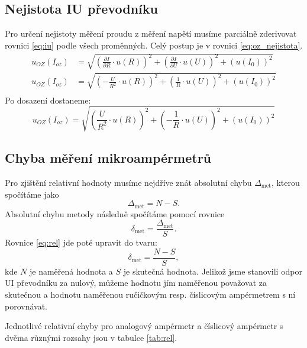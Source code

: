 \documentclass[a4paper,12pt]{article}   %
\begin{document}
\subsection{Nejistota IU převodníku}
Pro určení nejistoty měření proudu z měření napětí musíme parciálně zderivovat rovnici \ref{eq:iu} podle všech proměnných. Celý postup je v rovnici \ref{eq:oz_nejistota}.
\begin{equation}
    \begin{split}
        u_{OZ}(I_{oz})&=\sqrt{\left(\frac{\partial I}{\partial R} \cdot u(R)\right)^2+\left(\frac{\partial I}{\partial U} \cdot u(U)\right)^2+\left(u(I_0)\right)^2}\\
        u_{OZ}(I_{oz})&=\sqrt{\left(-\frac{U}{R^2}\cdot u(R)\right)^2+\left(\frac{1}{R}\cdot u(U)\right)^2+\left(u(I_0)\right)^2}\\
    \end{split}
    \label{eq:oz_nejistota}
\end{equation}
Po dosazení dostaneme:
\begin{equation*}
    u_{OZ}(I_{oz})=\sqrt{\left(\frac{U}{R^2}\cdot u(R)\right)^2+\left(-\frac{1}{R}\cdot u(U)\right)^2+\left(u(I_0)\right)^2}
\end{equation*}

\subsection{Chyba měření mikroampérmetrů}
Pro zjištění relativní hodnoty musíme nejdříve znát absolutní chybu $\Delta_{\textrm{met}}$, kterou spočítáme jako
\begin{equation}
    \Delta_{\textrm{met}} = N - S.
    \label{eq:abs}
\end{equation}
Absolutní chybu metody následně spočítáme pomocí rovnice 
\begin{equation}
    \delta_{\textrm{met}} = \frac{\Delta_{\textrm{met}}}{S}.
    \label{eq:rel}
\end{equation}
Rovnice \ref{eq:rel} jde poté upravit do tvaru:
\begin{equation}
    \delta_{\textrm{met}} = \frac{N-S}{S},
\end{equation}
kde $N$ je naměřená hodnota a $S$ je skutečná hodnota. Jelikož jsme stanovili odpor UI převodníku za nulový, můžeme hodnotu jím naměřenou považovat za skutečnou a hodnotu naměřenou ručičkovým resp. číslicovým ampérmetrem s ní porovnávat.

Jednotlivé relativní chyby pro analogový ampérmetr a číslicový ampérmetr s dvěma různými rozsahy jsou v tabulce \ref{tab:rel}.
\end{document}
